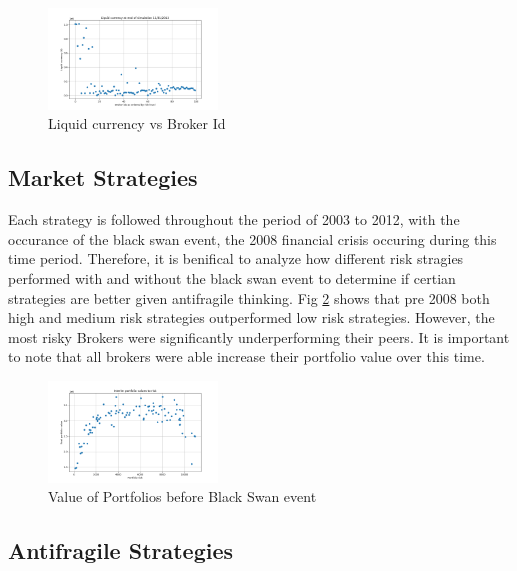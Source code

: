 \documentclass[letterpaper, 10 pt, proceedings]{ieeetran}
\begin{document}
	\begin{figure}[h]
		\centering
		\includegraphics[width=0.4\textwidth]{liquidCurrency.png}
		\caption{Liquid currency vs Broker Id}
		\label{liquidvID}
	\end{figure}
	\FloatBarrier	

	\subsection{Market Strategies}\label{subsec:results_midpoint}
	Each strategy is followed throughout the period of 2003 to 2012, with the occurance of the black swan event, the 2008 financial crisis occuring during this time period. Therefore, it is benifical to analyze how different risk stragies performed with and without the black swan event to determine if certian strategies are better given antifragile thinking. Fig \ref{interimRV} shows that pre 2008 both high and medium risk strategies outperformed low risk strategies. However, the most risky Brokers were significantly underperforming their peers. It is important to note that all brokers were able increase their portfolio value over this time.

	\begin{figure}[h]
		\centering
		\includegraphics[width=0.4\textwidth]{interimRiskToValue.png}
		\caption{Value of Portfolios before Black Swan event}
		\label{interimRV}
	\end{figure}
	\FloatBarrier


	\subsection{Antifragile Strategies}\label{subsec:results_end}	
	
\end{document}
